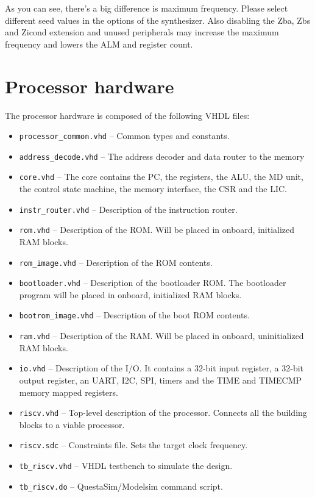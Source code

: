 \documentclass[12pt]{article}
\begin{document}
As you can see, there's a big difference is maximum frequency. Please select different seed values in the options of the synthesizer. Also disabling the Zba, Zbs and Zicond extension and unused peripherals may increase the maximum frequency and lowers the ALM and register count.

\section{Processor hardware}
\label{sec:hardware}
The processor hardware is composed of the following VHDL files:

\begin{itemize}
\item \lstinline|processor_common.vhd| -- Common types and constants.
\item \lstinline|address_decode.vhd| -- The address decoder and data router to the memory \item \lstinline|core.vhd| -- The core contains the PC, the registers, the ALU, the MD unit, the control state machine, the memory interface, the CSR and the LIC.
\item \lstinline|instr_router.vhd| -- Description of the instruction router.
\item \lstinline|rom.vhd| -- Description of the ROM. Will be placed in onboard, initialized RAM blocks. 
\item \lstinline|rom_image.vhd| -- Description of the ROM contents.
\item \lstinline|bootloader.vhd| -- Description of the bootloader ROM. The bootloader program will be placed in onboard, initialized RAM blocks.
\item \lstinline|bootrom_image.vhd| -- Description of the boot ROM contents.
\item \lstinline|ram.vhd| -- Description of the RAM. Will be placed in onboard, uninitialized RAM blocks. 
\item \lstinline|io.vhd| -- Description of the I/O. It contains a 32-bit input register, a 32-bit output register, an UART, I2C, SPI, timers and the TIME and TIMECMP memory mapped registers.
\item \lstinline|riscv.vhd| -- Top-level description of the processor. Connects all the building blocks to a viable processor.
\item \lstinline|riscv.sdc| -- Constraints file. Sets the target clock frequency.
\item \lstinline|tb_riscv.vhd| -- VHDL testbench to simulate the design.
\item \lstinline|tb_riscv.do| -- QuestaSim/Modelsim command script.
\end{itemize}
\end{document}
